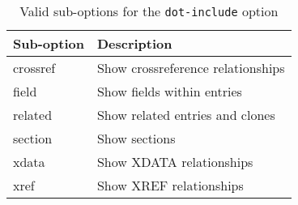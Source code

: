 \documentclass{ltxdockit}
\begin{document}
\begin{table}
\begin{center}
\small
\begin{tabular}{ll}
\toprule
Sub-option & Description\\
\midrule
crossref & Show crossreference relationships\\
field    & Show fields within entries\\
related  & Show related entries and clones\\
section  & Show sections\\
xdata    & Show XDATA relationships\\
xref     & Show XREF relationships\\
\bottomrule
\end{tabular}
\end{center}
\caption{Valid sub-options for the \texttt{dot-include} option}
\label{tab:graphopts}
\end{table}
\end{document}
